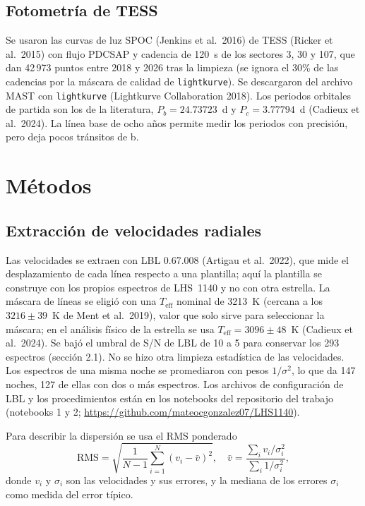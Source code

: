 \documentclass[twocolumn,aps,pra,11pt]{revtex4-2}
\begin{document}
\subsection{Fotometría de TESS}

Se usaron las curvas de luz SPOC (Jenkins et al.\ 2016) de TESS (Ricker et al.\ 2015) con flujo PDCSAP y cadencia de 120~s de los sectores 3, 30 y 107, que dan 42\,973 puntos entre 2018 y 2026 tras la limpieza (se ignora el 30\% de las cadencias por la máscara de calidad de \texttt{lightkurve}). Se descargaron del archivo MAST con \texttt{lightkurve} (Lightkurve Collaboration 2018). Los periodos orbitales de partida son los de la literatura, $P_b = 24.73723$~d y $P_c = 3.77794$~d (Cadieux et al.\ 2024). La línea base de ocho años permite medir los periodos con precisión, pero deja pocos tránsitos de b.

\section{Métodos}

\subsection{Extracción de velocidades radiales}

Las velocidades se extraen con LBL 0.67.008 (Artigau et al.\ 2022), que mide el desplazamiento de cada línea respecto a una plantilla; aquí la plantilla se construye con los propios espectros de LHS~1140 y no con otra estrella. La máscara de líneas se eligió con una $T_\mathrm{eff}$ nominal de 3213~K (cercana a los $3216 \pm 39$~K de Ment et al.\ 2019), valor que solo sirve para seleccionar la máscara; en el análisis físico de la estrella se usa $T_\mathrm{eff} = 3096 \pm 48$~K (Cadieux et al.\ 2024). Se bajó el umbral de S/N de LBL de 10 a 5 para conservar los 293 espectros (sección 2.1). No se hizo otra limpieza estadística de las velocidades. Los espectros de una misma noche se promediaron con pesos $1/\sigma^2$, lo que da 147 noches, 127 de ellas con dos o más espectros. Los archivos de configuración de LBL y los procedimientos están en los notebooks del repositorio del trabajo (notebooks 1 y 2; \url{https://github.com/mateocgonzalez07/LHS1140}).

Para describir la dispersión se usa el RMS ponderado
\begin{equation}
  \mathrm{RMS} = \sqrt{\frac{1}{N-1}\sum_{i=1}^{N}\left(v_i - \bar{v}\right)^2},\quad
  \bar{v} = \frac{\sum_i v_i/\sigma_i^2}{\sum_i 1/\sigma_i^2},
  \label{eq:rms}
\end{equation}
donde $v_i$ y $\sigma_i$ son las velocidades y sus errores, y la mediana de los errores $\sigma_i$ como medida del error típico.
\end{document}
